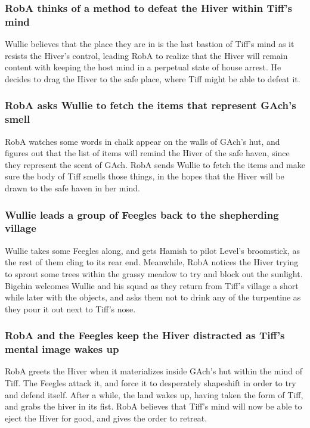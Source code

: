 \subsubsection{\Gls{RobA} thinks of a method to defeat the \Gls{Hiver} within \Gls{Tiff}'s mind}
\Gls{Wullie} believes that the place they are in is the last bastion of \Gls{Tiff}'s mind as it
resists the \Gls{Hiver}'s control, leading \Gls{RobA} to realize that the \Gls{Hiver} will remain
content with keeping the host mind in a perpetual state of house arrest. He decides to drag the
\Gls{Hiver} to the safe place, where \Gls{Tiff} might be able to defeat it.

\subsubsection{\Gls{RobA} asks \Gls{Wullie} to fetch the items that represent \Gls{GAch}'s smell}
\Gls{RobA} watches some words in chalk appear on the walls of \Gls{GAch}'s hut, and figures out that
the list of items will remind the \Gls{Hiver} of the safe haven, since they represent the scent of
\Gls{GAch}. \Gls{RobA} sends \Gls{Wullie} to fetch the items and make sure the body of \Gls{Tiff}
smells those things, in the hopes that the \Gls{Hiver} will be drawn to the safe haven in her mind.

\subsubsection{\Gls{Wullie} leads a group of Feegles back to the shepherding village}
\Gls{Wullie} takes some Feegles along, and gets \Gls{Hamish} to pilot \Gls{Level}'s broomstick, as
the rest of them cling to its rear end. Meanwhile, \Gls{RobA} notices the \Gls{Hiver} trying to
sprout some trees within the grassy meadow to try and block out the sunlight. \Gls{Bigchin}
welcomes \Gls{Wullie} and his squad as they return from \Gls{Tiff}'s village a short while later
with the objects, and asks them not to drink any of the turpentine as they pour it out next to
\Gls{Tiff}'s nose.

\subsubsection{\Gls{RobA} and the Feegles keep the \Gls{Hiver} distracted as \Gls{Tiff}'s mental
    image wakes up}
\Gls{RobA} greets the \Gls{Hiver} when it materializes inside \Gls{GAch}'s hut within the mind of
\Gls{Tiff}. The Feegles attack it, and force it to desperately shapeshift in order to try and
defend itself. After a while, the land wakes up, having taken the form of \Gls{Tiff}, and grabs
the hiver in its fist. \Gls{RobA} believes that \Gls{Tiff}'s mind will now be able to eject the
\Gls{Hiver} for good, and gives the order to retreat.

